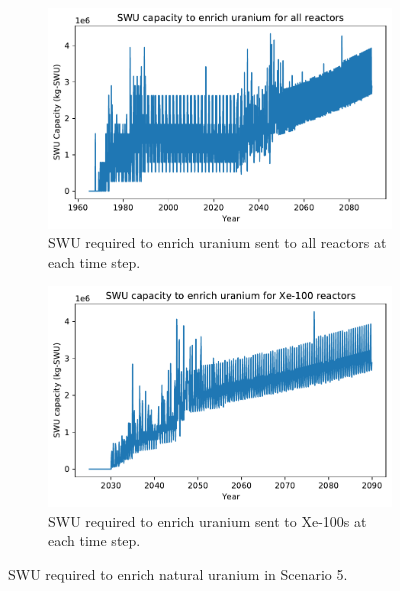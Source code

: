 \begin{figure}
    \centering
    \begin{subfigure}{0.45\textwidth}
        \centering
        \includegraphics[scale=0.4]{../figures/totalswu_scenarios_5.pdf}
        \caption{\gls{SWU} required to enrich uranium sent to all reactors at each time step.}
        \label{fig:totalswu_5}
    \end{subfigure}
    \hspace{0.8cm}
    \begin{subfigure}{0.45\textwidth}
        \centering
        \includegraphics[scale=0.4]{../figures/haleuSWU_scenarios_5.pdf}
        \caption{\gls{SWU} required to enrich uranium sent to Xe-100s at each time step.}
        \label{fig:haleuswu_5}
    \end{subfigure}
    \caption{\gls{SWU} required to enrich natural uranium in Scenario 5.}
    \label{fig:swu_5}
\end{figure}

